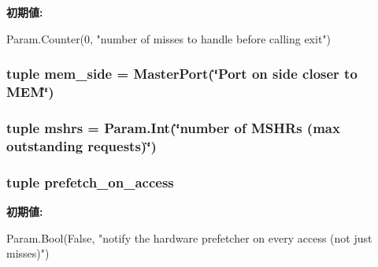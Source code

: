 \label{classBaseCache_1_1BaseCache_a51e99500c857b9a43def7df123f04211}
{\bfseries 初期値:}
\begin{DoxyCode}
Param.Counter(0,
        "number of misses to handle before calling exit")
\end{DoxyCode}
\hypertarget{classBaseCache_1_1BaseCache_a4753243a6eb570c8aca99d06979cddee}{
\subsubsection[{mem\_\-side}]{\setlength{\rightskip}{0pt plus 5cm}tuple {\bf mem\_\-side} = {\bf MasterPort}(\char`\"{}Port on side closer to MEM\char`\"{})}}
\label{classBaseCache_1_1BaseCache_a4753243a6eb570c8aca99d06979cddee}
\hypertarget{classBaseCache_1_1BaseCache_a9654d86897b3fa84b4ce812f955467a5}{
\subsubsection[{mshrs}]{\setlength{\rightskip}{0pt plus 5cm}tuple {\bf mshrs} = Param.Int(\char`\"{}number of MSHRs (max outstanding requests)\char`\"{})}}
\label{classBaseCache_1_1BaseCache_a9654d86897b3fa84b4ce812f955467a5}
\hypertarget{classBaseCache_1_1BaseCache_a53a99d890ac829666ac272f59ceabdff}{
\subsubsection[{prefetch\_\-on\_\-access}]{\setlength{\rightskip}{0pt plus 5cm}tuple {\bf prefetch\_\-on\_\-access}}}
\label{classBaseCache_1_1BaseCache_a53a99d890ac829666ac272f59ceabdff}
{\bfseries 初期値:}
\begin{DoxyCode}
Param.Bool(False,
         "notify the hardware prefetcher on every access (not just misses)")
\end{DoxyCode}

